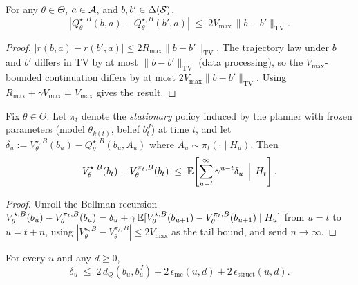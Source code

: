 \begin{lem}\label{lem:Q_lipschitz_tv}
For any $\theta\in\Theta$, $a\in{\mathcal{A}}$, and $b,b'\in\Delta({\mathcal{S}})$,
\[
|Q_\theta^{\star,B}(b,a)-Q_\theta^{\star,B}(b',a)|\;\le\;2V_{\max}\,\|b-b'\|_{\mathrm{TV}}.
\]
\end{lem}

\begin{proof}
$|r(b,a)-r(b',a)|\le 2R_{\max}\|b-b'\|_{\mathrm{TV}}$. The trajectory law under $b$ and $b'$ differs in TV by at most $\|b-b'\|_{\mathrm{TV}}$ (data processing), so the $V_{\max}$-bounded continuation differs by at most $2V_{\max}\|b-b'\|_{\mathrm{TV}}$. Using $R_{\max}+\gamma V_{\max}=V_{\max}$ gives the result.
\end{proof}

\begin{lem}\label{lem:perf_decomp_delta}
Fix $\theta\in\Theta$. Let $\pi_t$ denote the \emph{stationary} policy induced by the planner with frozen parameters (model $\bar\theta_{k(t)}$, belief $b_t^J$) at time $t$, and let $\delta_u:=V_{\theta}^{\star,B}(b_u)-Q_{\theta}^{\star,B}(b_u,A_u)$ where $A_u\sim\pi_t(\cdot\mid H_u)$. Then
\[
V_{\theta}^{\star,B}(b_t)-V_{\theta}^{\pi_t,B}(b_t)
\;\le\;
\mathbb{E}\!\left[\sum_{u=t}^\infty \gamma^{u-t}\delta_u\,\Bigm|\, H_t\right].
\]
\end{lem}

\begin{proof}
Unroll the Bellman recursion $V_{\theta}^{\star,B}(b_u)-V_{\theta}^{\pi_t,B}(b_u)=\delta_u+\gamma\,\mathbb{E}[V_{\theta}^{\star,B}(b_{u+1})-V_{\theta}^{\pi_t,B}(b_{u+1})\mid H_u]$ from $u=t$ to $u=t+n$, using $|V_{\theta}^{\star,B}-V_{\theta}^{\pi_t,B}|\le 2V_{\max}$ as the tail bound, and send $n\to\infty$.
\end{proof}

\begin{lem}\label{lem:delta_bound_main}
For every $u$ and any $d\ge 0$,
\[
\delta_u
\;\le\;
2\,d_Q(b_u,b_u^J)
+
2\,\epsilon_{\mathrm{mc}}(u,d)
+
2\,\epsilon_{\mathrm{struct}}(u,d).
\]
\end{lem}

